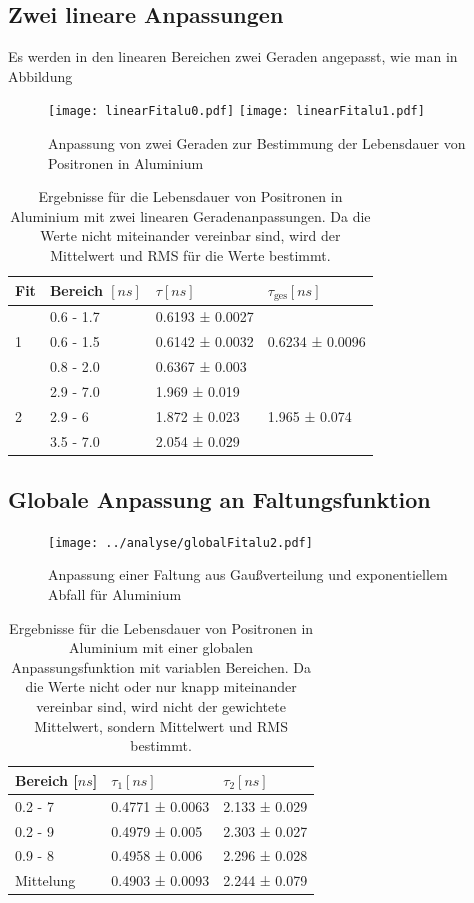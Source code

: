 \documentclass[a4paper,12pt]{article}
\begin{document}
\subsection{Zwei lineare Anpassungen}
Es werden in den linearen Bereichen zwei Geraden angepasst, wie man in Abbildung 
\begin{figure}
	\texttt{[image: linearFitalu0.pdf]}
	\texttt{[image: linearFitalu1.pdf]}
	\caption{Anpassung von zwei Geraden zur Bestimmung der Lebensdauer von Positronen in Aluminium}
	\label{fig:dualLinearFitalu}
\end{figure}

\begin{table}[h]
	\begin{tabular}{l |l l ||l}
			Fit& Bereich $[\si{ns}]$ & $τ [\si{ns}]$ & $τ_\text{ges} [\si{ns}]$ \\
		\hline
		\multirow{3}{*}{1} & 0.6 - 1.7 &  0.6193 ± 0.0027   &\multirow{3}{*}{  0.6234 ± 0.0096}\\
	 & 0.6 - 1.5 &  0.6142 ± 0.0032   &\\
	 & 0.8 - 2.0 &  0.6367 ± 0.003   &\\
	 \hline
	 \multirow{3}{*}{2}  & 2.9 - 7.0 &  1.969 ± 0.019   &\multirow{3}{*}{1.965 ± 0.074 }\\
	 & 2.9 - 6 &  1.872 ± 0.023   &\\
	 & 3.5 - 7.0 &  2.054 ± 0.029   &
	\end{tabular}
	\centering
	\caption{Ergebnisse für die Lebensdauer von Positronen in Aluminium mit zwei linearen
		Geradenanpassungen. Da die Werte nicht miteinander vereinbar sind, wird der Mittelwert und
	RMS für die Werte bestimmt.}
	\label{tab:linearPoly}
\end{table}
\subsection{Globale Anpassung an Faltungsfunktion}
\begin{figure}[htb]
	\centering
	\texttt{[image: ../analyse/globalFitalu2.pdf]}
	\caption{Anpassung einer Faltung aus Gaußverteilung und exponentiellem Abfall für Aluminium}
	\label{fig:globalFitalu}
\end{figure}
\begin{table}[h]
	\begin{tabular}{l |l l}
		Bereich [$\si{ns}$] & $τ_1 [\si{ns}]$ & $τ_2 [\si{ns}]$ \\
		\hline
0.2 - 7 &  0.4771 ± 0.0063   &  2.133 ± 0.029  \\
0.2 - 9 &  0.4979 ± 0.005   &  2.303 ± 0.027  \\
0.9 - 8 &  0.4958 ± 0.006   &  2.296 ± 0.028  \\
		\hline
		\hline
		Mittelung & 0.4903 ± 0.0093 & 2.244 ± 0.079
	\end{tabular}
	\centering
	\caption{Ergebnisse für die Lebensdauer von Positronen in Aluminium mit einer globalen
	Anpassungsfunktion mit variablen Bereichen. Da die Werte nicht oder nur knapp miteinander
		vereinbar sind, wird nicht der gewichtete Mittelwert, sondern Mittelwert und RMS bestimmt.}
	\label{tab:globalPoly}
\end{table}
\end{document}
